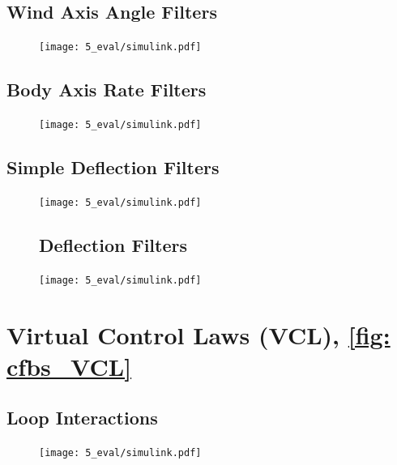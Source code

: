 \documentclass[12pt]{ucthesis}
\begin{document}
\subsection{Wind Axis Angle Filters}
\label{subsec: app_CF_2}
	\begin{figure}[H]
		\begin{adjustwidth}{-1in}{-1in}
			\centering
			\texttt{[image: 5\_eval/simulink.pdf]}%
		\end{adjustwidth}
		\label{fig: cfbs_CF2}
	\end{figure}
\subsection{Body Axis Rate Filters}
\label{subsec: app_CF_3}
	\begin{figure}[H]
		\begin{adjustwidth}{-1in}{-1in}
			\centering
			\texttt{[image: 5\_eval/simulink.pdf]}%
		\end{adjustwidth}
		\label{fig: cfbs_CF3}
	\end{figure}
\subsection{Simple Deflection Filters}
\label{subsec: app_CF_5}
	\begin{figure}[H]
		\centering
		\texttt{[image: 5\_eval/simulink.pdf]}%
		\label{fig: cfbs_CF5}
	\end{figure}

	\begin{figure}
	\subsection{Deflection Filters}
	\label{subsec: app_CF_4}
			\centering
			\texttt{[image: 5\_eval/simulink.pdf]}%
		\label{fig: cfbs_CF4}
	\end{figure}
\section{Virtual Control Laws (VCL), \autoref{fig: cfbs_VCL}}
\label{sec: app_VCL}
\subsection{Loop Interactions}
\label{subsec: app_VCL_int}
	\begin{figure}[H]
		\begin{adjustwidth}{-1in}{-1in}
			\centering
			\texttt{[image: 5\_eval/simulink.pdf]}%
		\end{adjustwidth}
		\label{fig: cfbs_VCL_int}
	\end{figure}
\end{document}
